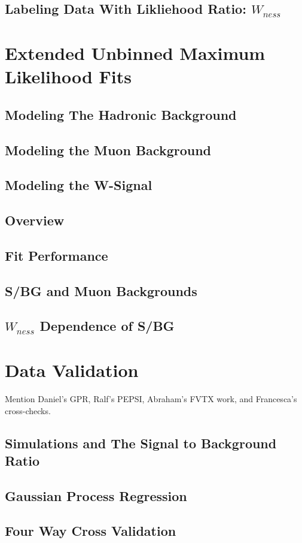 \subsection{Labeling Data With Likliehood Ratio: $W_{ness}$}
\label{likelihood}
\section{Extended Unbinned Maximum Likelihood Fits}
\subsection{Modeling The Hadronic Background}
\subsection{Modeling the Muon Background}
\subsection{Modeling the W-Signal}
\subsection{Overview}
\subsection{Fit Performance}
\subsection{S/BG and Muon Backgrounds}
\subsection{$W_{ness}$ Dependence of S/BG}
\section{Data Validation}
Mention Daniel's GPR, Ralf's PEPSI, Abraham's FVTX work, and Francesca's cross-checks.
\subsection{Simulations and The Signal to Background Ratio}
\subsection{Gaussian Process Regression}
\subsection{Four Way Cross Validation}
